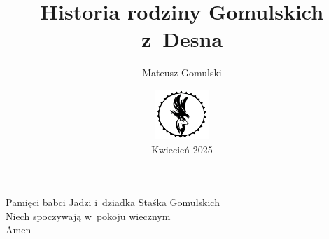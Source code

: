 \documentclass[left=2.5cm, right=2.5cm, top=2.5cm, bottom=3cm, 
bindingoffset=6mm, nohyphenation=false]{Pakiety/thesis}
\title{\Huge{\textbf{Historia rodziny Gomulskich z~Desna}}}
\author{Mateusz Gomulski}
\date{\vfill \includegraphics[width=0.15\textwidth]{GML_LOGO5_black4.png}
\large{\\Kwiecień 2025}}
\begin{document}


\cleardoublepage

\clearpage
\setcounter{page}{1}
\maketitle

\cleardoublepage
\begin{center}
	\thispagestyle{empty}
    \vspace*{3cm}
    \Large{Pamięci babci Jadzi i~dziadka Staśka Gomulskich \\ 
    Niech spoczywają w~pokoju wiecznym \\ Amen ~\CrossOpenShadow}
    \vfill
\end{center}

\cleardoublepage
\tableofcontents

\cleardoublepage


\cleardoublepage


\cleardoublepage


\cleardoublepage


\cleardoublepage


\cleardoublepage


\cleardoublepage

                           
\cleardoublepage
\newrefcontext[sorting=nty]
\printbibliography

\cleardoublepage




\end{document}
